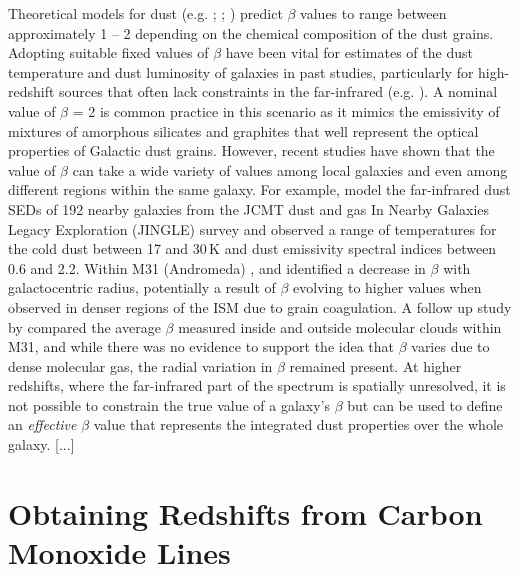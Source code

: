 Theoretical models for dust (e.g. \citealt{Draine_1984}; \citealt{Draine_2011}; \citealt{Kohler_2015}) predict $\beta$ values to range between approximately 1 -- 2 depending on the chemical composition of the dust grains. Adopting suitable fixed values of $\beta$ have been vital for estimates of the dust temperature and dust luminosity of galaxies in past studies, particularly for high-redshift sources that often lack constraints in the far-infrared (e.g. ). A nominal value of $\beta$ = 2 is common practice in this scenario as it mimics the emissivity of mixtures of amorphous silicates and graphites that well represent the optical properties of Galactic dust grains. However, recent studies have shown that the value of $\beta$ can take a wide variety of values among local galaxies and even among different regions within the same galaxy. For example, \citealt{Lamperti_2019} model the far-infrared dust SEDs of 192 nearby galaxies from the JCMT dust and gas In Nearby Galaxies Legacy Exploration (JINGLE) survey and observed a range of temperatures for the cold dust between 17 and 30\,K and dust emissivity spectral indices between 0.6 and 2.2. Within M31 (Andromeda) \citealt{Smith_2012}, \citealt{Draine_2014} and \citealt{Whitworth_2019} identified a decrease in $\beta$ with galactocentric radius, potentially a result of $\beta$ evolving to higher values when observed in denser regions of the ISM due to grain coagulation. A follow up study by \citealt{Athikkat-Eknath_2022} compared the average $\beta$ measured inside and outside molecular clouds within M31, and while there was no evidence to support the idea that $\beta$ varies due to dense molecular gas, the radial variation in $\beta$ remained present. At higher redshifts, where the far-infrared part of the spectrum is spatially unresolved, it is not possible to constrain the true value of a galaxy's $\beta$ but can be used to define an \textit{effective} $\beta$ value that represents the integrated dust properties over the whole galaxy. [...]

\section{Obtaining Redshifts from Carbon Monoxide Lines}

